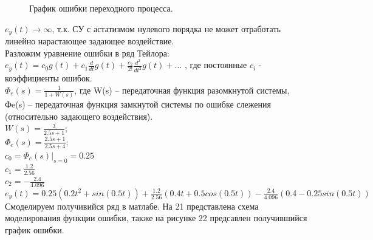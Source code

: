 \documentclass[a4paper, 11pt]{article}
\begin{document}
\newpage
    
\begin{figure}[h!]
    \caption{График ошибки переходного процесса.}
    \label{tree}
\end{figure}



$e_y(t)\to\infty$, т.к. СУ с астатизмом нулевого порядка не может отработать линейно нарастающее задающее воздействие.\\

Разложим уравнение ошибки в ряд Тейлора:
$e_y(t)=c_0g(t)+c_1\frac{d}{dt}g(t)+\frac{c_2}{2!}\frac{d^2}{dt^2}g(t)+...$ , где постоянные $c_i$ - коэффициенты ошибок.\\

$\Phi_e(s)=\frac{1}{1+W(s)}$, где W(s) – передаточная функция разомкнутой системы, Фe(s) – передаточная функция замкнутой системы по ошибке слежения (относительно задающего воздействия).\\

	$W(s)=\frac {3} {2.5s+1};$ \\
	
	$\Phi_e(s)=\frac{2.5s+1}{2.5s+4};$ \\
	
	$c_0=\Phi_e(s) | _{s=0} =0.25$ \\
	
	$c_1=\frac{1.2}{2.56}$ \\
	
	$c_2=-\frac{2.4}{4.096}$ \\
	
	$e_y(t)=0.25(0.2t^2+sin(0.5t))+\frac{1.2}{2.56}(0.4t+0.5cos(0.5t))-\frac{2.4}{4.096}(0.4-0.25sin(0.5t))$\\
	
Смоделируем получивийся ряд в матлабе. На 21 представлена схема моделирования функции ошибки, также на рисунке 22 предсавлен получившийся график ошибки.
\end{document}
